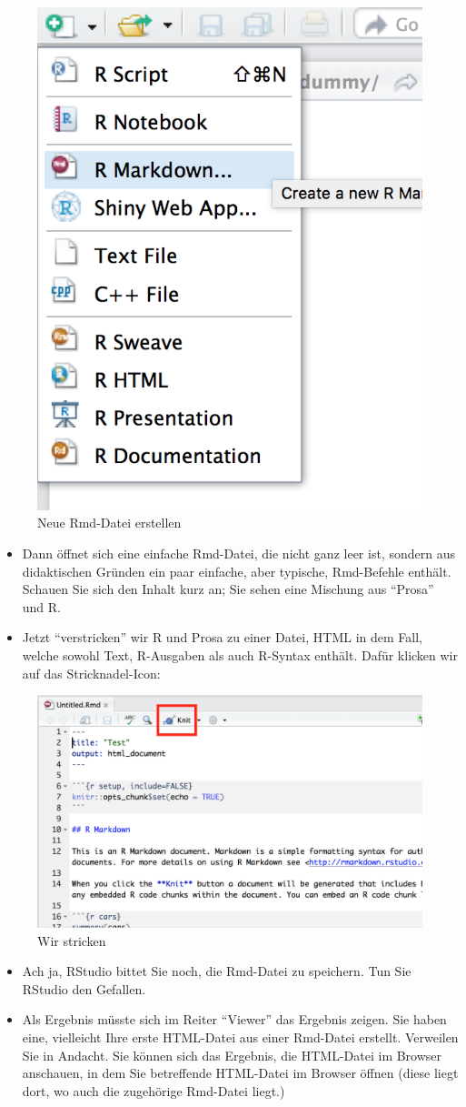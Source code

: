 \documentclass[12pt,]{book}
\begin{document}
\begin{figure}

{\centering \includegraphics[width=0.3\linewidth]{images/new_rmd} 

}

\caption{Neue Rmd-Datei erstellen}\label{fig:unnamed-chunk-4}
\end{figure}

\begin{itemize}
\item
  Dann öffnet sich eine einfache Rmd-Datei, die nicht ganz leer ist,
  sondern aus didaktischen Gründen ein paar einfache, aber typische,
  Rmd-Befehle enthält. Schauen Sie sich den Inhalt kurz an; Sie sehen
  eine Mischung aus ``Prosa'' und R.
\item
  Jetzt ``verstricken'' wir R und Prosa zu einer Datei, HTML in dem
  Fall, welche sowohl Text, R-Ausgaben als auch R-Syntax enthält. Dafür
  klicken wir auf das Stricknadel-Icon:
\end{itemize}

\begin{figure}

{\centering \includegraphics[width=0.5\linewidth]{images/rmd_demo} 

}

\caption{Wir stricken}\label{fig:unnamed-chunk-5}
\end{figure}

\begin{itemize}
\item
  Ach ja, RStudio bittet Sie noch, die Rmd-Datei zu speichern. Tun Sie
  RStudio den Gefallen.
\item
  Als Ergebnis müsste sich im Reiter ``Viewer'' das Ergebnis zeigen. Sie
  haben eine, vielleicht Ihre erste HTML-Datei aus einer Rmd-Datei
  erstellt. Verweilen Sie in Andacht. Sie können sich das Ergebnis, die
  HTML-Datei im Browser anschauen, in dem Sie betreffende HTML-Datei im
  Browser öffnen (diese liegt dort, wo auch die zugehörige Rmd-Datei
  liegt.)
\end{itemize}
\end{document}

